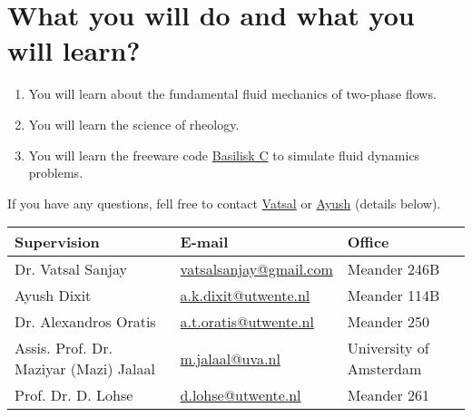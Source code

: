 \documentclass[a4paper,10pt]{article}
\begin{document}
\section*{What you will do and what you will learn?}
\begin{enumerate}
\item You will learn about the fundamental fluid mechanics of two-phase flows.
\item You will learn the science of rheology.
\item You will learn the freeware code \href{http://basilisk.fr}{Basilisk C} to simulate fluid dynamics problems.
\end{enumerate}

If you have any questions, fell free to contact \href{mailto:vatsalsanjay@gmail.com}{Vatsal} or \href{mailto:a.k.dixit@utwente.nl}{Ayush} (details below).
\begin{center}
\begin{tabular}{|l|l|l|}
\hline \textbf{Supervision} & \textbf{E-mail} & \textbf{Office} \\
\hline Dr. Vatsal Sanjay & \href{mailto:vatsalsanjay@gmail.com}{vatsalsanjay@gmail.com} & Meander 246B \\
\hline Ayush Dixit & \href{mailto:a.k.dixit@utwente.nl}{a.k.dixit@utwente.nl} & Meander 114B \\
\hline Dr. Alexandros Oratis   & \href{mailto:a.t.oratis@utwente.nl}{a.t.oratis@utwente.nl}& Meander 250 \\
\hline Assis. Prof. Dr. Maziyar (Mazi) Jalaal   & \href{mailto:m.jalaal@uva.nl}{m.jalaal@uva.nl}& University of Amsterdam \\
\hline Prof. Dr. D. Lohse & \href{mailto:d.lohse@utwente.nl}{d.lohse@utwente.nl} & Meander 261  \\
\hline
\end{tabular}
\end{center}
\printbibliography
\end{document}
